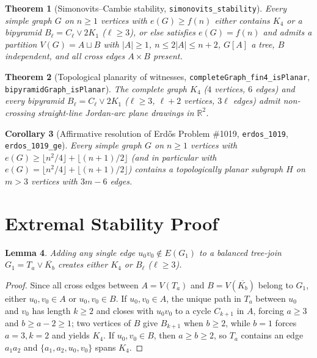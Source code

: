 \documentclass[11pt]{amsart}
\newtheorem{theorem}{Theorem}
\newtheorem{lemma}[theorem]{Lemma}
\newtheorem{corollary}[theorem]{Corollary}
\begin{document}
\begin{theorem}[Simonovits--Cambie stability, \texttt{simonovits\_stability}]\label{thm:stab}
Every simple graph $G$ on $n \ge 1$ vertices with $e(G) \ge f(n)$ either contains $K_4$ or a bipyramid $B_\ell = C_\ell \vee 2K_1$ ($\ell \ge 3$), or else satisfies $e(G) = f(n)$ and admits a partition $V(G) = A \sqcup B$ with $|A| \ge 1$, $n \le 2|A| \le n+2$, $G[A]$ a tree, $B$ independent, and all cross edges $A \times B$ present.
\end{theorem}

\begin{theorem}[Topological planarity of witnesses, \texttt{completeGraph\_fin4\_isPlanar}, \texttt{bipyramidGraph\_isPlanar}]\label{thm:plan}
The complete graph $K_4$ ($4$ vertices, $6$ edges) and every bipyramid $B_\ell = C_\ell \vee 2K_1$ ($\ell \ge 3$, $\ell+2$ vertices, $3\ell$ edges) admit non-crossing straight-line Jordan-arc plane drawings in $\mathbb{R}^2$.
\end{theorem}

\begin{corollary}[Affirmative resolution of Erd\H{o}s Problem \#1019, \texttt{erdos\_1019}, \texttt{erdos\_1019\_ge}]\label{cor:main}
Every simple graph $G$ on $n \ge 1$ vertices with $e(G) \ge \lfloor n^2/4 \rfloor + \lfloor (n+1)/2 \rfloor$ (and in particular with $e(G) = \lfloor n^2/4 \rfloor + \lfloor (n+1)/2 \rfloor$) contains a topologically planar subgraph $H$ on $m > 3$ vertices with $3m - 6$ edges.
\end{corollary}

\section{Extremal Stability Proof}

\begin{lemma}\label{lem:extra}
Adding any single edge $u_0 v_0 \notin E(G_1)$ to a balanced tree-join $G_1 = T_a \vee \overline{K_b}$ creates either $K_4$ or $B_\ell$ ($\ell \ge 3$).
\end{lemma}
\begin{proof}
Since all cross edges between $A = V(T_a)$ and $B = V(\overline{K_b})$ belong to $G_1$, either $u_0, v_0 \in A$ or $u_0, v_0 \in B$. If $u_0, v_0 \in A$, the unique path in $T_a$ between $u_0$ and $v_0$ has length $k \ge 2$ and closes with $u_0 v_0$ to a cycle $C_{k+1}$ in $A$, forcing $a \ge 3$ and $b \ge a - 2 \ge 1$; two vertices of $B$ give $B_{k+1}$ when $b \ge 2$, while $b = 1$ forces $a = 3, k = 2$ and yields $K_4$. If $u_0, v_0 \in B$, then $a \ge b \ge 2$, so $T_a$ contains an edge $a_1 a_2$ and $\{a_1, a_2, u_0, v_0\}$ spans $K_4$.
\end{proof}
\end{document}

